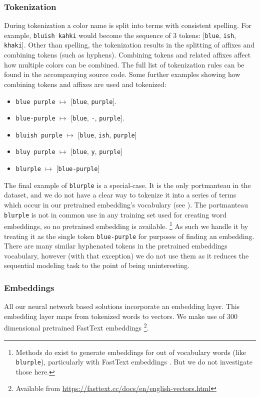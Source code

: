 \documentclass[]{clv3}
\newcommand{\parencite}{\citep}
\newcommand{\natlang}[1]{\texttt{#1}}
\begin{document}
\subsubsection{Tokenization}
During tokenization a color name is split into terms with consistent spelling.
For example, \natlang{bluish kahki} would become the sequence of 3 tokens: [\natlang{blue}, \natlang{ish}, \natlang{khaki}].
Other than spelling, the tokenization results in the splitting of affixes and combining tokens (such as hyphens).
Combining tokens and related affixes affect how multiple colors can be combined.
The full list of tokenization rules can be found in the accompanying source code.
Some further examples showing how combining tokens and affixes are used and tokenized:
\begin{itemize}
	\item \natlang{blue purple} $\mapsto$ [\natlang{blue}, \natlang{purple}].
	\item \natlang{blue-purple} $\mapsto$ [\natlang{blue}, \natlang{-}, \natlang{purple}].
	\item \natlang{bluish purple} $\mapsto$ [\natlang{blue}, \natlang{ish}, \natlang{purple}]
	\item \natlang{bluy purple} $\mapsto$ [\natlang{blue}, \natlang{y}, \natlang{purple}]
	\item \natlang{blurple} $\mapsto$ [\natlang{blue-purple}]
\end{itemize}
The final example of \natlang{blurple} is a special-case.
It is the only portmanteau in the dataset, and we do not have a clear way to tokenize it into a series of terms which occur in our pretrained embedding's vocabulary (see ).
The portmanteau \natlang{blurple} is not in common use in any training set used for creating word embeddings, so no pretrained embedding is available.%
\footnote{Methods do exist to generate embeddings for out of vocabulary words (like \natlang{blurple}), particularly with FastText embeddings \parencite{bojanowski2016enriching}. But we do not investigate those here.}
As such we handle it by treating it as the single token \natlang{blue-purple} for purposes of finding an embedding.
There are many similar hyphenated tokens in the pretrained embeddings vocabulary, however (with that exception) we do not use them as it reduces the sequential modeling task to the point of being uninteresting.

\subsubsection{Embeddings}\label{sec:embeddings} 
All our neural network based solutions incorporate an embedding layer.
This embedding layer maps from tokenized words to vectors.
We make use of 300 dimensional pretrained FastText embeddings \parencite{bojanowski2016enriching}\footnote{Available from \url{https://fasttext.cc/docs/en/english-vectors.html}}.
\end{document}
